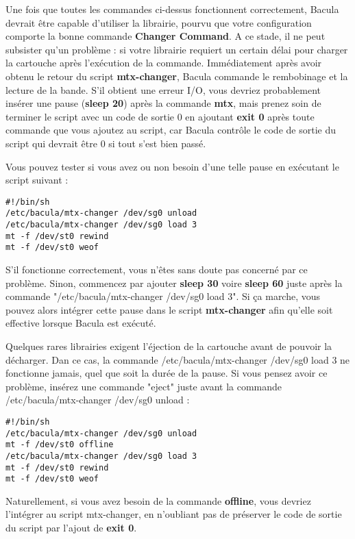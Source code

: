 Une fois que toutes les commandes ci-dessus fonctionnent correctement, Bacula 
devrait \^etre capable d'utiliser la librairie, pourvu que votre configuration 
comporte la bonne commande {\bf Changer Command}. A ce stade, il ne peut subsister 
qu'un probl\`eme : si votre librairie requiert un certain d\'elai pour charger la cartouche 
apr\`es l'ex\'ecution de la commande. Imm\'ediatement apr\`es avoir obtenu le retour 
du script {\bf mtx-changer}, Bacula commande le rembobinage et la lecture de la bande. 
S'il obtient une erreur I/O, vous devriez probablement ins\'erer une pause ({\bf sleep 20})  
apr\`es la commande  {\bf mtx}, mais prenez soin de terminer le script avec un 
code de sortie 0 en ajoutant {\bf exit 0} apr\`es toute commande que vous ajoutez 
au script, car Bacula contr\^ole le code de sortie du script qui devrait \^etre 0 si 
tout s'est bien pass\'e.

Vous pouvez tester si vous avez ou non besoin d'une telle pause en 
ex\'ecutant le script suivant :

\footnotesize
\begin{verbatim}
#!/bin/sh
/etc/bacula/mtx-changer /dev/sg0 unload
/etc/bacula/mtx-changer /dev/sg0 load 3
mt -f /dev/st0 rewind
mt -f /dev/st0 weof
\end{verbatim}
\normalsize

S'il fonctionne correctement, vous n'\^etes sans doute pas concern\'e par ce 
probl\`eme. Sinon, commencez par ajouter {\bf sleep 30}  voire {\bf sleep 60} 
juste apr\`es la commande "/etc/bacula/mtx-changer /dev/sg0 load 3". Si 
\c{c}a marche, vous pouvez alors int\'egrer cette pause dans le script 
{\bf mtx-changer} afin qu'elle soit effective lorsque Bacula est ex\'ecut\'e. 

Quelques rares librairies exigent l'\'ejection de la cartouche avant de pouvoir 
la d\'echarger. Dan ce cas, la commande /etc/bacula/mtx-changer /dev/sg0 load 3 
ne fonctionne jamais, quel que soit la dur\'ee de la pause. Si vous pensez 
avoir ce probl\`eme, ins\'erez une commande "eject" juste avant la commande 
/etc/bacula/mtx-changer /dev/sg0 unload :

\footnotesize
\begin{verbatim}
#!/bin/sh
/etc/bacula/mtx-changer /dev/sg0 unload
mt -f /dev/st0 offline
/etc/bacula/mtx-changer /dev/sg0 load 3
mt -f /dev/st0 rewind
mt -f /dev/st0 weof
\end{verbatim}
\normalsize

Naturellement, si vous avez besoin de la commande {\bf offline}, vous devriez 
l'int\'egrer au script mtx-changer, en n'oubliant pas de pr\'eserver le code de 
sortie du script par l'ajout de {\bf exit 0}.

